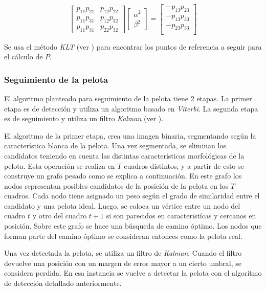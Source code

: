 \documentclass[a4paper,10pt]{article}
\begin{document}
\begin{equation}
\begin{bmatrix}
    p_{1 1} p_{2 1} & p_{1 2} p_{2 2} \\
    p_{1 1} p_{3 1} & p_{1 2} p_{3 2} \\
    p_{1 1} p_{3 1} & p_{2 2} p_{3 2}
\end{bmatrix}
\begin{bmatrix}
    \alpha^2 \\
    \beta^2
\end{bmatrix}
 =
\begin{bmatrix}
    - p_{1 3} p_{2 3} \\
    - p_{1 3} p_{3 3} \\
    - p_{2 3} p_{3 3} \\
\end{bmatrix}
\end{equation}

Se usa el método \textit{KLT} (ver \cite{KLT}) para encontrar los puntos de referencia a seguir para el cálculo de $P$.

\subsubsection*{Seguimiento de la pelota}

El algoritmo planteado para seguimiento de la pelota tiene 2 etapas.
La primer etapa es de detección y utiliza un algoritmo basado en \textit{Viterbi}.
La segunda etapa es de seguimiento y utiliza un filtro \textit{Kalman} (ver \cite{funk2003study}).

El algoritmo de la primer etapa, crea una imagen binaria, segmentando según la característica blanca de la pelota.
Una vez segmentada, se eliminan los candidatos teniendo en cuenta las distintas características morfológicas de la pelota.
Esta operación se realiza en $T$ cuadros distintos, y a partir de esto se construye un grafo pesado como se explica a continuación.
En este grafo los nodos representan posibles candidatos de la posición de la pelota en los $T$ cuadros.
Cada nodo tiene asignado un peso según el grado de similaridad entre el candidato y una pelota ideal.
Luego, se coloca un vértice entre un nodo del cuadro $t$ y otro del cuadro $t + 1$ si son parecidos en caracteristícas y cercanos en posición.
Sobre este grafo se hace una búsqueda de camino óptimo. Los nodos que forman parte del camino óptimo se consideran entonces
como la pelota real.

Una vez detectada la pelota, se utiliza un filtro de \textit{Kalman}.
Cuando el filtro devuelve una posición con un margen de error mayor a un cierto umbral, se considera perdida.
En esa instancia se vuelve a detectar la pelota con el algoritmo de detección detallado anteriormente.
\end{document}
